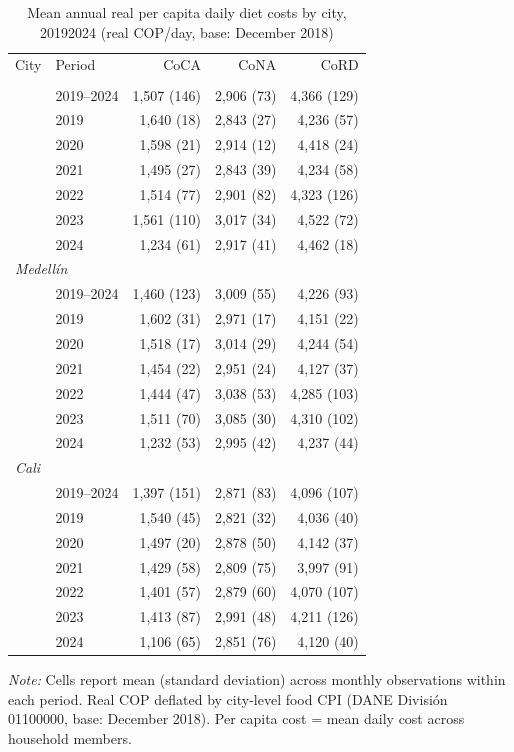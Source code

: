 \begin{table}[htbp]
\centering\small
\caption{Mean annual real per capita daily diet costs by city, 2019\textendash{}2024 (real COP/day, base: December 2018)}
\label{tab:cost_real}
\begin{tabular}{llrrr}
\toprule
City & Period & CoCA & CoNA & CoRD \\
\addlinespace[2pt]
\midrule
\multicolumn{5}{l}{\textit{Bogotá}} \\
 & 2019–2024 & 1,507 (146) & 2,906 (73) & 4,366 (129) \\
 & 2019 & 1,640 (18) & 2,843 (27) & 4,236 (57) \\
 & 2020 & 1,598 (21) & 2,914 (12) & 4,418 (24) \\
 & 2021 & 1,495 (27) & 2,843 (39) & 4,234 (58) \\
 & 2022 & 1,514 (77) & 2,901 (82) & 4,323 (126) \\
 & 2023 & 1,561 (110) & 3,017 (34) & 4,522 (72) \\
 & 2024 & 1,234 (61) & 2,917 (41) & 4,462 (18) \\
\midrule
\multicolumn{5}{l}{\textit{Medellín}} \\
 & 2019–2024 & 1,460 (123) & 3,009 (55) & 4,226 (93) \\
 & 2019 & 1,602 (31) & 2,971 (17) & 4,151 (22) \\
 & 2020 & 1,518 (17) & 3,014 (29) & 4,244 (54) \\
 & 2021 & 1,454 (22) & 2,951 (24) & 4,127 (37) \\
 & 2022 & 1,444 (47) & 3,038 (53) & 4,285 (103) \\
 & 2023 & 1,511 (70) & 3,085 (30) & 4,310 (102) \\
 & 2024 & 1,232 (53) & 2,995 (42) & 4,237 (44) \\
\midrule
\multicolumn{5}{l}{\textit{Cali}} \\
 & 2019–2024 & 1,397 (151) & 2,871 (83) & 4,096 (107) \\
 & 2019 & 1,540 (45) & 2,821 (32) & 4,036 (40) \\
 & 2020 & 1,497 (20) & 2,878 (50) & 4,142 (37) \\
 & 2021 & 1,429 (58) & 2,809 (75) & 3,997 (91) \\
 & 2022 & 1,401 (57) & 2,879 (60) & 4,070 (107) \\
 & 2023 & 1,413 (87) & 2,991 (48) & 4,211 (126) \\
 & 2024 & 1,106 (65) & 2,851 (76) & 4,120 (40) \\
\bottomrule
\end{tabular}
\begin{minipage}{\linewidth}
\vspace{2pt}\footnotesize
\textit{Note:} Cells report mean (standard deviation) across monthly observations within each period. Real COP deflated by city-level food CPI (DANE Divisi\'{o}n 01100000, base: December 2018). Per capita cost = mean daily cost across household members.
\end{minipage}
\end{table}
